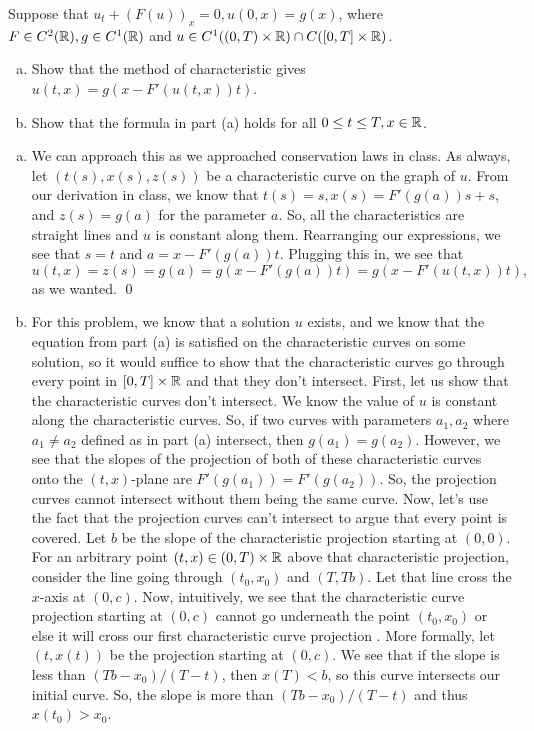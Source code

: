 \documentclass{article}
\begin{document}
\newpage
{}Suppose that $u_t+ (F (u))_x= 0, u(0, x) = g(x)$, where $F \in C^2(\mathbb{R}), g \in C^1(\mathbb{R})$
and $u \in C^1((0, T ) \times \mathbb{R}) \cap C([0, T ] \times \mathbb{R})$.
\begin{enumerate}[(a)]
    \item Show that the method of characteristic gives $u(t, x) = g(x - F'(u(t, x))t)$.
    \item Show that the formula in part (a) holds for all $0 \le t \le T, x \in \mathbb{R}$. 
\end{enumerate}
\tri
\hop
\solution
\begin{enumerate}[(a)]
    \item We can approach this as we approached conservation laws in class. As always, let $(t(s), x(s), z(s))$ be a characteristic curve on the graph of $u$. From our derivation in class, we know that $t(s) = s, x(s)= F'(g(a))s + s$, and $z(s) = g(a)$ for the parameter $a$. So, all the characteristics are straight lines and $u$ is constant along them. Rearranging our expressions, we see that $s = t$ and $a = x - F'(g(a))t$. Plugging this in, we see that 
    \[u(t,x) = z(s) = g(a) = g(x - F'(g(a))t) = g(x - F'(u(t,x))t),\]
    as we wanted.  \qed
    \item For this problem, we know that a solution $u$ exists, and we know that the equation from part (a) is satisfied on the characteristic curves on some solution, so it would suffice to show that the characteristic curves go through every point in $[0,T] \times \mathbb{R}$ and that they don't intersect. 
    \hop
    First, let us show that the characteristic curves don't intersect. We know the value of $u$ is constant along the characteristic curves. So, if two curves with parameters $a_1, a_2$ where $a_1 \ne a_2$ defined as in part (a) intersect, then $g(a_1) = g(a_2)$. However, we see that the slopes of the projection of both of these characteristic curves onto the $(t,x)$-plane are  $F'(g(a_1)) = F'(g(a_2))$. So, the projection curves cannot intersect without them being the same curve.
    \hop 
    Now, let's use the fact that the projection curves can't intersect to argue that every point is covered. Let $b$ be the slope of the characteristic projection starting at $(0,0)$. For an arbitrary point $(t,x) \in (0,T) \times \mathbb{R}$ above that characteristic projection, consider the line going through $(t_0,x_0)$ and $(T,Tb)$. Let that line cross the $x$-axis at $(0,c)$. Now, intuitively, we see that the characteristic curve projection starting at $(0,c)$ cannot go underneath the point $(t_0,x_0)$ or else it will cross our first characteristic curve projection . More formally, let $(t,x(t))$ be the projection starting at $(0,c)$. We see that if the slope is less than $(Tb-x_0)/(T-t)$, then $x(T) < b$, so this curve intersects our initial curve. So, the slope is more than $(Tb-x_0)/(T-t)$ and thus $x(t_0) > x_0$. 

\end{enumerate}
\end{document}
